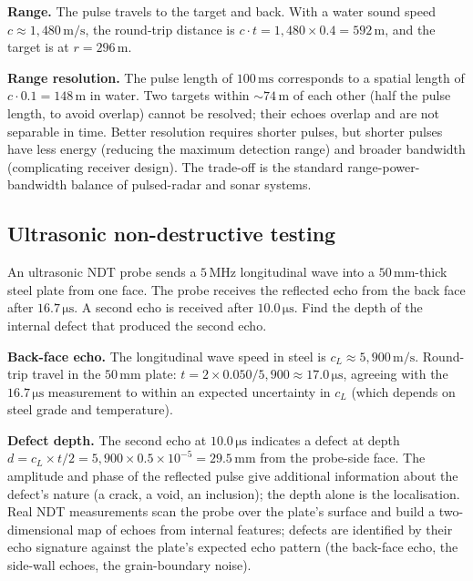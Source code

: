\textbf{Range.} The pulse travels to the target and back. With a
water sound speed $c \approx 1{,}480\,\si{\meter\per\second}$, the
round-trip distance is $c \cdot t = 1{,}480 \times 0.4 = 592\,\si{
\meter}$, and the target is at $r = 296\,\si{\meter}$.

\textbf{Range resolution.} The pulse length of $100\,\si{\milli\second}$
corresponds to a spatial length of $c \cdot 0.1 = 148\,\si{\meter}$
in water. Two targets within $\sim 74\,\si{\meter}$ of each other
(half the pulse length, to avoid overlap) cannot be resolved; their
echoes overlap and are not separable in time. Better resolution
requires shorter pulses, but shorter pulses have less energy
(reducing the maximum detection range) and broader bandwidth
(complicating receiver design). The trade-off is the standard
range-power-bandwidth balance of pulsed-radar and sonar systems.

\subsection{Ultrasonic non-destructive testing}

An ultrasonic NDT probe sends a $5\,\si{\mega\hertz}$ longitudinal
wave into a $50\,\si{\milli\meter}$-thick steel plate from one
face. The probe receives the reflected echo from the back face
after $16.7\,\si{\micro\second}$. A second echo is received after
$10.0\,\si{\micro\second}$. Find the depth of the internal defect
that produced the second echo.

\textbf{Back-face echo.} The longitudinal wave speed in steel is
$c_L \approx 5{,}900\,\si{\meter\per\second}$. Round-trip travel in
the $50\,\si{\milli\meter}$ plate: $t = 2 \times 0.050/5{,}900 \approx
17.0\,\si{\micro\second}$, agreeing with the $16.7\,\si{\micro\second}$
measurement to within an expected uncertainty in $c_L$ (which depends
on steel grade and temperature).

\textbf{Defect depth.} The second echo at $10.0\,\si{\micro\second}$
indicates a defect at depth $d = c_L \times t/2 = 5{,}900 \times
0.5 \times 10^{-5} = 29.5\,\si{\milli\meter}$ from the probe-side
face. The amplitude and phase of the reflected pulse give additional
information about the defect's nature (a crack, a void, an inclusion);
the depth alone is the localisation. Real NDT measurements scan the
probe over the plate's surface and build a two-dimensional map of
echoes from internal features; defects are identified by their
echo signature against the plate's expected echo pattern (the
back-face echo, the side-wall echoes, the grain-boundary noise).

